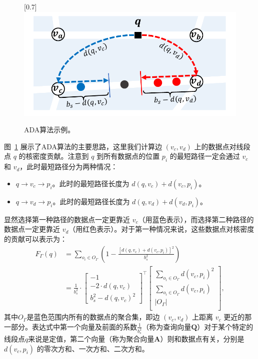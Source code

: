 \begin{figure}[h]\centering
	\scalebox{0.7}[0.7]{\includegraphics{./figures/Preliminary_ADA.pdf}}
	\caption{ADA算法示例。}
	\label{fig-ADA}
\end{figure}

图~\ref{fig-ADA} 展示了ADA算法的主要思路，这里我们计算边 $(v_c, v_d)$ 上的数据点对线段点 $q$ 的核密度贡献。注意到 $q$ 到所有数据点的位置 $p_i$ 的最短路径一定会通过 $v_c$ 和 $v_d$，此时最短路径分为两种情况：
\begin{itemize}
	\item $q \rightarrow v_c \rightarrow p_i$。此时的最短路径长度为 $d(q, v_c) + d(v_c, p_i)$。
	\item $q \rightarrow v_d \rightarrow p_i$。此时的最短路径长度为 $d(q, v_d) + d(v_d, p_i)$。
\end{itemize}
显然选择第一种路径的数据点一定更靠近 $v_c$（用蓝色表示），而选择第二种路径的数据点一定更靠近 $v_d$（用红色表示）。对于第一种情况来说，这些数据点对核密度的贡献可以表示为：
\begin{equation*}
\begin{aligned}
	F_\Gamma(q) &= \sum_{o_i \in O_\Gamma} \left(1 - \frac{[d(q, v_c) + d(v_c, p_i)]^2}{b_s^2}\right) \\
	&= \frac{1}{b_s^2} \cdot
	\begin{bmatrix}
		-1 \\
		-2 \cdot d(q, v_c) \\
		b_s^2 - d(q, v_c)^2
	\end{bmatrix}^\top
	\begin{bmatrix}
		\sum_{o_i \in O_\Gamma} d(v_c, p_i)^2 \\
		\sum_{o_i \in O_\Gamma} d(v_c, p_i) \\
		\vert O_\Gamma \vert \\
	\end{bmatrix},
\end{aligned}
\end{equation*}
其中$O_\Gamma$是蓝色范围内所有的数据点的聚合集，即边 $(v_c, v_d)$ 上距离 $v_c$ 更近的那一部分。表达式中第一个向量及前面的系数$\frac{1}{b_s^2}$（称为查询向量$\mathbf{Q}$）对于某个特定的线段点$q$来说是定值，第二个向量（称为聚合向量$\mathbf{A}$）则和数据点有关，分别是 $d(v_c, p_i)$ 的零次方和、一次方和、二次方和。

